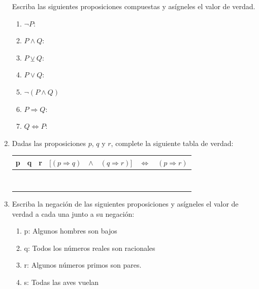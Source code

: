 \documentclass[letterpaper,fleqn]{article}
\begin{document}
\begin{enumerate}
Escriba las siguientes proposiciones compuestas y asígneles el valor de verdad.
\begin{enumerate}
\item $\neg P$: \noanswer
\item $P\wedge Q$: \noanswer
\item $P \veebar Q$: \noanswer
\item $P\vee Q$: \noanswer
\newpage
\item $\neg (P\wedge Q)$ \noanswer
\item $P\Rightarrow Q$: \noanswer
\item $Q\Leftrightarrow P$: \noanswer
\end{enumerate}
\item Dadas las proposiciones $p$, $q$ y $r$, complete la siguiente tabla de verdad:
\begin{center}
\begin{tabular}{|c|c|c|ccccc|}
\hline 
p & q & r & $[(p\Rightarrow q)$ & $\wedge$ & $(q\Rightarrow r)]$ & $\Leftrightarrow$ & $(p\Rightarrow r)$ \\ 
\hline 
 & & & & & & &  \\ 
 & & & & & & &  \\ 
 & & & & & & &  \\ 
  & & & & & & &  \\ 
   & & & & & & &  \\ 
    & & & & & & &  \\ 
     & & & & & & &  \\ 
      & & & & & & &  \\ \hline
\end{tabular} 
\end{center}
\item Escriba la negación de las siguientes proposiciones y asígneles el valor de verdad a cada una junto a su negación:
\begin{enumerate}
\item p: Algunos hombres son bajos \noanswer
\item q: Todos los números reales son racionales\noanswer
\item r: Algunos números primos son pares.\noanswer
\item s: Todas las aves vuelan
\end{enumerate}
 \end{enumerate}
\end{document}

